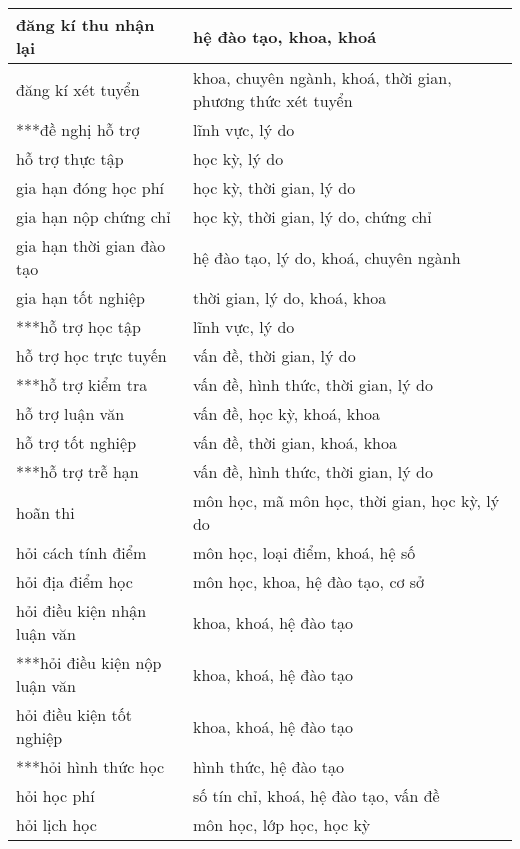 \begin{table}[htbp]
\begin{tabular}{|l|l|}
        \hline
        đăng kí thu nhận lại & hệ đào tạo, khoa, khoá \\
        \hline
        đăng kí xét tuyển & khoa, chuyên ngành, khoá, thời gian, phương thức xét tuyển \\
        \hline
        ***đề nghị hỗ trợ & lĩnh vực, lý do \\
        \hline
        hỗ trợ thực tập & học kỳ, lý do \\
        \hline
        gia hạn đóng học phí & học kỳ, thời gian, lý do \\
        \hline
        gia hạn nộp chứng chỉ & học kỳ, thời gian, lý do, chứng chỉ \\
        \hline
        gia hạn thời gian đào tạo & hệ đào tạo, lý do, khoá, chuyên ngành \\
        \hline
        gia hạn tốt nghiệp & thời gian, lý do, khoá, khoa \\
        \hline
        ***hỗ trợ học tập & lĩnh vực, lý do \\
        \hline
        hỗ trợ học trực tuyến & vấn đề, thời gian, lý do \\
        \hline
        ***hỗ trợ kiểm tra & vấn đề, hình thức, thời gian, lý do \\
        \hline
        hỗ trợ luận văn & vấn đề, học kỳ, khoá, khoa \\
        \hline
        hỗ trợ tốt nghiệp & vấn đề, thời gian, khoá, khoa \\
        \hline
        ***hỗ trợ trễ hạn & vấn đề, hình thức, thời gian, lý do \\
        \hline
        hoãn thi & môn học, mã môn học, thời gian, học kỳ, lý do \\
        \hline
        hỏi cách tính điểm & môn học, loại điểm, khoá, hệ số \\
        \hline
        hỏi địa điểm học & môn học, khoa, hệ đào tạo, cơ sở \\
        \hline
        hỏi điều kiện nhận luận văn & khoa, khoá, hệ đào tạo \\
        \hline
        ***hỏi điều kiện nộp luận văn & khoa, khoá, hệ đào tạo \\
        \hline
        hỏi điều kiện tốt nghiệp & khoa, khoá, hệ đào tạo \\
        \hline
        ***hỏi hình thức học & hình thức, hệ đào tạo \\
        \hline
        hỏi học phí & số tín chỉ, khoá, hệ đào tạo, vấn đề \\
        \hline
        hỏi lịch học & môn học, lớp học, học kỳ \\

\end{tabular}
\end{table}
